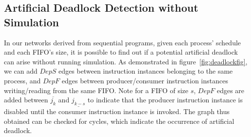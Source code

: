 \subsection{Artificial Deadlock Detection without Simulation}
In our networks derived from sequential programs, given each process' schedule and each FIFO's size, it is possible
to find out if a potential artificial deadlock can arise without running simulation. As demonstrated in figure~\ref{fig:deadlockfig}, we can add $DepS$ edges between instruction instances belonging to the same process, and $DepF$ edges between
producer/consumer instruction instances writing/reading from the same FIFO.
Note for a FIFO of size $s$, $DepF$ edges are added between $\overline{j_k}$ and $\underline{j_{k-s}}$ to indicate that the producer instruction instance is disabled
until the consumer instruction instance is invoked. The graph thus obtained
can be checked for cycles, which indicate the occurrence of artificial deadlock.


